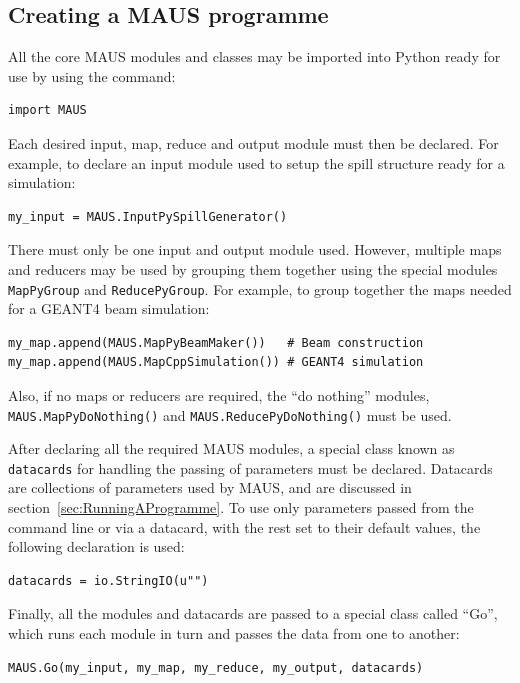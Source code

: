 \documentclass[a4paper,10pt]{article}
\begin{document}
  \subsection{Creating a MAUS programme}
    All the core MAUS modules and classes may be imported into Python ready for use by using the command:
\lstset{language=Python} 
    \begin{lstlisting}
import MAUS
    \end{lstlisting}
    Each desired input, map, reduce and output module must then be declared.  For example, to declare an input module used to setup the spill structure ready for a simulation:
    \begin{lstlisting}
my_input = MAUS.InputPySpillGenerator()
    \end{lstlisting}
    There must only be one input and output module used.  However, multiple maps and reducers may be used by grouping them together using the special modules \texttt{MapPyGroup} and \texttt{ReducePyGroup}. For example, to group together the maps needed for a GEANT4 beam simulation:
    \begin{lstlisting}
my_map.append(MAUS.MapPyBeamMaker())   # Beam construction
my_map.append(MAUS.MapCppSimulation()) # GEANT4 simulation
    \end{lstlisting}
    Also, if no maps or reducers are required, the ``do nothing'' modules, \texttt{MAUS.MapPyDoNothing()} and \texttt{MAUS.ReducePyDoNothing()} must be used.

    After declaring all the required MAUS modules, a special class known as \texttt{datacards} for handling the passing of parameters must be declared. Datacards are collections of parameters used by MAUS, and are discussed in section~\ref{sec:RunningAProgramme}. To use only parameters passed from the command line or via a datacard, with the rest set to their default values, the following declaration is used:
    \begin{lstlisting}
datacards = io.StringIO(u"")
    \end{lstlisting}

    Finally, all the modules and datacards are passed to a special class called ``Go'', which runs each module in turn and passes the data from one to another:
    \begin{lstlisting}
MAUS.Go(my_input, my_map, my_reduce, my_output, datacards)
    \end{lstlisting}
\end{document}
